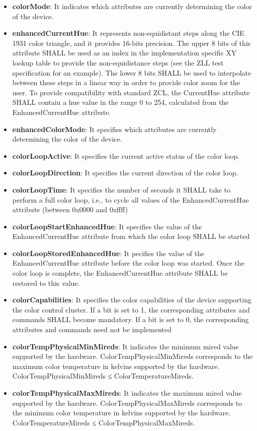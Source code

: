 \begin{itemize}
\item \textbf{colorMode}: It indicates which attributes are currently determining the color of the device.
\item \textbf{enhancedCurrentHue}: It represents non-equidistant steps along the CIE 1931 color triangle, and it provides 16-bits precision. The upper 8 bits of this attribute SHALL be used as an index in the implementation specific XY lookup table to provide the non-equidistance steps (see the ZLL test specification for an example). The lower 8 bits SHALL be used to interpolate between these steps in a linear way in order to provide color zoom for the user. To provide compatibility with standard ZCL, the CurrentHue attribute SHALL contain a hue value in the range 0 to 254, calculated from the EnhancedCurrentHue attribute.
\item \textbf{enhancedColorMode}: It specifies which attributes are currently determining the color of the device.
\item \textbf{colorLoopActive}: It specifies the current active status of the color loop.
\item \textbf{colorLoopDirection}: It specifies the current direction of the color loop.
\item \textbf{colorLoopTime}: It specifies the number of seconds it SHALL take to perform a full color loop, i.e., to cycle all values of the EnhancedCurrentHue attribute (between 0x0000 and 0xffff)
\item \textbf{colorLoopStartEnhancedHue}: It specifies the value of the EnhancedCurrentHue attribute from which the color loop SHALL be started
\item \textbf{colorLoopStoredEnhancedHue}: It pecifies the value of the EnhancedCurrentHue attribute before the color loop was started. Once the color loop is complete, the EnhancedCurrentHue attribute SHALL be restored to this value.
\item \textbf{colorCapabilities}: It specifies the color capabilities of the device supporting the color control cluster. If a bit is set to 1, the corresponding attributes and commands SHALL become mandatory. If a bit is set to 0, the corresponding attributes and commands need not be implemented
\item \textbf{colorTempPhysicalMinMireds}: It indicates the minimum mired value supported by the hardware. ColorTempPhysicalMinMireds corresponds to the maximum color temperature in kelvins supported by the hardware. ColorTempPhysicalMinMireds ≤ ColorTemperatureMireds.
\item \textbf{colorTempPhysicalMaxMireds}: It indicates the maximum mired value supported by the hardware. ColorTempPhysicalMaxMireds corresponds to the minimum color temperature in kelvins supported by the hardware. ColorTemperatureMireds ≤ ColorTempPhysicalMaxMireds.

\end{itemize}
